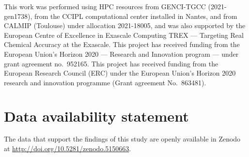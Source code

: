 \documentclass[aip,jcp,reprint,noshowkeys,superscriptaddress,floatfix]{revtex4-1}
\begin{document}
\begin{acknowledgements}
This work was performed using HPC resources from GENCI-TGCC (2021-gen1738), from the CCIPL computational center installed in Nantes, and from CALMIP (Toulouse) under allocation 2021-18005, and was also supported by the European Centre of Excellence in Exascale Computing TREX --- Targeting Real Chemical Accuracy at the Exascale. This project has received funding from the European Union's Horizon 2020 --- Research and Innovation program --- under grant agreement no.~952165.
This project has received funding from the European Research Council (ERC) under the European Union's Horizon 2020 research and innovation programme (Grant agreement No.~863481).
\end{acknowledgements}

\section*{Data availability statement}
The data that support the findings of this study are openly available in Zenodo at \url{http://doi.org/10.5281/zenodo.5150663}.


\end{document}
